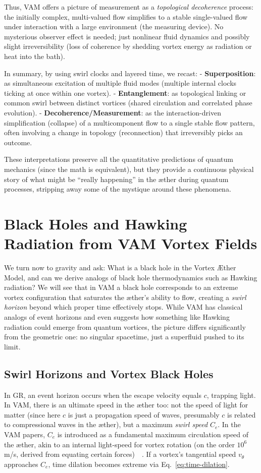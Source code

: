 \documentclass[a4paper,12pt]{article}
\begin{document}
    Thus, VAM offers a picture of measurement as a \emph{topological decoherence} process: the initially complex, multi-valued flow simplifies to a stable single-valued flow under interaction with a large environment (the measuring device). No mysterious observer effect is needed; just nonlinear fluid dynamics and possibly slight irreversibility (loss of coherence by shedding vortex energy as radiation or heat into the bath).

    In summary, by using swirl clocks and layered time, we recast:
    - \textbf{Superposition}: as simultaneous excitation of multiple fluid modes (multiple internal clocks ticking at once within one vortex).
    - \textbf{Entanglement}: as topological linking or common swirl between distinct vortices (shared circulation and correlated phase evolution).
    - \textbf{Decoherence/Measurement}: as the interaction-driven simplification (collapse) of a multicomponent flow to a single stable flow pattern, often involving a change in topology (reconnection) that irreversibly picks an outcome.

    These interpretations preserve all the quantitative predictions of quantum mechanics (since the math is equivalent), but they provide a continuous physical story of what might be “really happening” in the æther during quantum processes, stripping away some of the mystique around these phenomena.

\section{Black Holes and Hawking Radiation from VAM Vortex Fields}
    We turn now to gravity and ask: What is a black hole in the Vortex Æther Model, and can we derive analogs of black hole thermodynamics such as Hawking radiation? We will see that in VAM a black hole corresponds to an extreme vortex configuration that saturates the æther’s ability to flow, creating a \emph{swirl horizon} beyond which proper time effectively stops. While VAM has classical analogs of event horizons and even suggests how something like Hawking radiation could emerge from quantum vortices, the picture differs significantly from the geometric one: no singular spacetime, just a superfluid pushed to its limit.

    \subsection{Swirl Horizons and Vortex Black Holes}
    In GR, an event horizon occurs when the escape velocity equals $c$, trapping light. In VAM, there is an ultimate speed in the æther too: not the speed of light for matter (since here $c$ is just a propagation speed of waves, presumably $c$ is related to compressional waves in the æther), but a maximum \emph{swirl speed} $C_e$. In the VAM papers, $C_e$ is introduced as a fundamental maximum circulation speed of the æther, akin to an internal light-speed for vortex rotation (on the order $10^6$ m/s, derived from equating certain forces)~\cite{reference_115}~\cite{reference_116}. If a vortex’s tangential speed $v_\theta$ approaches $C_e$, time dilation becomes extreme via Eq.~\eqref{eq:time-dilation}.
\end{document}
